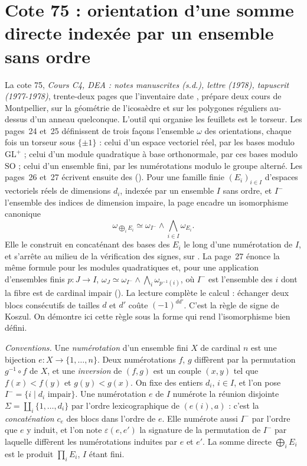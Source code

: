 \section[Cote 75 : orientation d'une somme directe indexée par un ensemble sans ordre]{Cote 75 : orientation d'une somme directe indexée par un ensemble sans ordre\protect{}}\label{sec:75}

La cote 75, \emph{Cours C4, DEA : notes manuscrites (s.d.), lettre (1978), tapuscrit (1977-1978)}, trente-deux pages que l'inventaire date , prépare deux cours de Montpellier, sur la géométrie de l'icosaèdre et sur les polygones réguliers au-dessus d'un anneau quelconque. L'outil qui organise les feuillets est le torseur. Les pages~24 et~25 définissent de trois façons l'ensemble $\omega$ des orientations, chaque fois un torseur sous $\{\pm 1\}$ : celui d'un espace vectoriel réel, par les bases modulo $\mathrm{GL}^+$ ; celui d'un module quadratique à base orthonormale, par ces bases modulo $\mathrm{SO}$ ; celui d'un ensemble fini, par les numérotations modulo le groupe alterné. Les pages~26 et~27 écrivent ensuite des  (). Pour une famille finie $(E_i)_{i \in I}$ d'espaces vectoriels réels de dimensions $d_i$, indexée par un ensemble $I$ sans ordre, et $I^-$ l'ensemble des indices de dimension impaire, la page encadre un isomorphisme canonique
\[
\omega_{\bigoplus_i E_i} \simeq \omega_{I^-} \wedge \bigwedge_{i \in I} \omega_{E_i} .
\]
Elle le construit en concaténant des bases des $E_i$ le long d'une numérotation de $I$, et s'arrête au milieu de la vérification des signes, sur . La page~27 énonce la même formule pour les modules quadratiques et, pour une application d'ensembles finis $p : J \to I$, $\omega_J \simeq \omega_{I^-} \wedge \bigwedge_i \omega_{p^{-1}(i)}$, où $I^-$ est l'ensemble des $i$ dont la fibre est de cardinal impair (). La lecture complète le calcul : échanger deux blocs consécutifs de tailles $d$ et $d'$ coûte $(-1)^{d d'}$. C'est la règle de signe de Koszul. On démontre ici cette règle sous la forme qui rend l'isomorphisme bien défini.

\noindent\emph{Conventions.} Une \emph{numérotation} d'un ensemble fini $X$ de cardinal $n$ est une bijection $e : X \to \{1, \ldots, n\}$. Deux numérotations $f$, $g$ diffèrent par la permutation $g^{-1} \circ f$ de $X$, et une \emph{inversion} de $(f, g)$ est un couple $(x, y)$ tel que $f(x) < f(y)$ et $g(y) < g(x)$. On fixe des entiers $d_i$, $i \in I$, et l'on pose $I^- = \{i \mid d_i \text{ impair}\}$. Une numérotation $e$ de $I$ numérote la réunion disjointe $\Sigma = \coprod_i \{1, \ldots, d_i\}$ par l'ordre lexicographique de $(e(i), a)$ : c'est la \emph{concaténation} $c_e$ des blocs dans l'ordre de $e$. Elle numérote aussi $I^-$ par l'ordre que $e$ y induit, et l'on note $\varepsilon(e, e')$ la signature de la permutation de $I^-$ par laquelle diffèrent les numérotations induites par $e$ et $e'$. La somme directe $\bigoplus_i E_i$ est le produit $\prod_i E_i$, $I$ étant fini.

